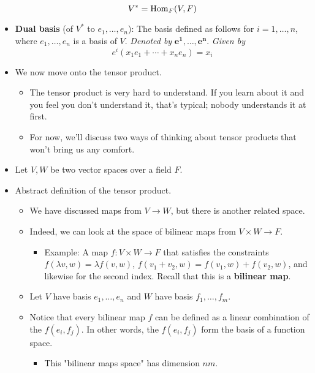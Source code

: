 \documentclass[../notes.tex]{subfiles}
\begin{document}
\begin{itemize}
    \begin{equation*}
        V^* = \operatorname{Hom}_F(V,F)
    \end{equation*}
    \item \textbf{Dual basis} (of $V^*$ to $e_1,\dots,e_n$): The basis defined as follows for $i=1,\dots,n$, where $e_1,\dots,e_n$ is a basis of $V$. \emph{Denoted by} $\bm{e^1,\ldots,e^n}$. \emph{Given by}
    \begin{equation*}
        e^i(x_1e_1+\cdots+x_ne_n) = x_i
    \end{equation*}
    \item We now move onto the tensor product.
    \begin{itemize}
        \item The tensor product is very hard to understand. If you learn about it and you feel you don't understand it, that's typical; nobody understands it at first.
        \item For now, we'll discuss two ways of thinking about tensor products that won't bring us any comfort.
    \end{itemize}
    \item Let $V,W$ be two vector spaces over a field $F$.
    \item Abstract definition of the tensor product.
    \begin{itemize}
        \item We have discussed maps from $V\to W$, but there is another related space.
        \item Indeed, we can look at the space of bilinear maps from $V\times W\to F$.
        \begin{itemize}
            \item Example: A map $f:V\times W\to F$ that satisfies the constraints $f(\lambda v,w)=\lambda f(v,w)$, $f(v_1+v_2,w)=f(v_1,w)+f(v_2,w)$, and likewise for the second index. Recall that this is a \textbf{bilinear map}.
        \end{itemize}
        \item Let $V$ have basis $e_1,\dots,e_n$ and $W$ have basis $f_1,\dots,f_m$.
        \item Notice that every bilinear map $f$ can be defined as a linear combination of the $f(e_i,f_j)$. In other words, the $f(e_i,f_j)$ form the basis of a function space.
        \begin{itemize}
            \item This "bilinear maps space" has dimension $nm$.
        \end{itemize}

\end{itemize}
\end{itemize}
\end{document}
